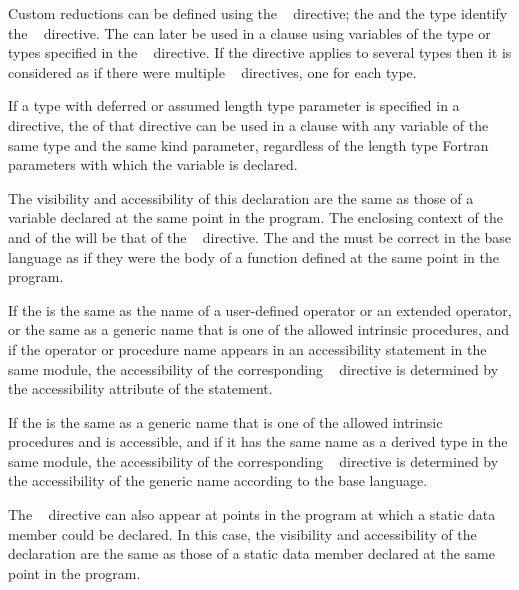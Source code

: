 \descr
Custom reductions can be defined using the ~ directive; the
 and the type identify the ~ directive. The
 can later be used in a  clause using variables of the
type or types specified in the ~ directive. If the directive applies
to several types then it is considered as if there were multiple ~
directives, one for each type.

\begin{fortranspecific}
If a type with deferred or assumed length type parameter is specified in a ~ directive, the  of that directive can be used in a  clause with any variable of the same type and the same kind parameter, regardless of the length type Fortran parameters with which the variable is declared.
\end{fortranspecific}

The visibility and accessibility of this declaration are the same as those of a variable
declared at the same point in the program. The enclosing context of the  and of
the  will be that of the ~ directive. The 
and the  must be correct in the base language as if they were the body of
a function defined at the same point in the program.

\begin{fortranspecific}
If the  is the same as the name of a user-defined operator or an extended operator, or the same as a generic name that is one of the allowed intrinsic procedures, and if the operator or procedure name appears in an accessibility statement in the same module, the accessibility of the corresponding ~ directive is determined by the accessibility attribute of the statement.

If the  is the same as a generic name that is one of the allowed intrinsic procedures and is accessible, and if it has the same name as a derived type in the same module, the accessibility of the corresponding ~ directive is determined by the accessibility of the generic name according to the base language.
\end{fortranspecific}

\begin{cppspecific}
The ~ directive can also appear at points in the program at which
a static data member could be declared. In this case, the visibility and accessibility of
the declaration are the same as those of a static data member declared at the same point
in the program.
\end{cppspecific}

